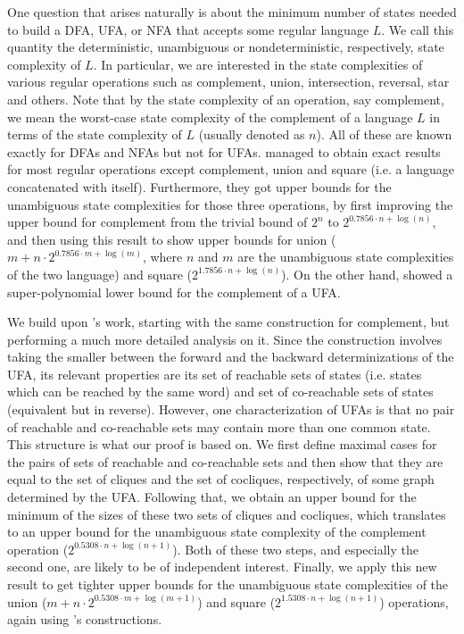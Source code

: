 \documentclass{report}
\theoremstyle{definition}
\begin{document}
One question that arises naturally is about the minimum number of states needed
to build a DFA, UFA, or NFA that accepts some regular language $L$. We call this
quantity the deterministic, unambiguous or nondeterministic, respectively, state
complexity of $L$. In particular, we are interested in the state complexities
of various regular operations such as complement, union, intersection, reversal,
star and others. Note that by the state complexity of an operation, say
complement, we mean the worst-case state complexity of the complement of a
language $L$ in terms of the state complexity of $L$ (usually denoted as $n$).
All of these are known exactly for DFAs and NFAs but not for UFAs.
\cite{UFA_UB} managed to obtain exact results for most regular
operations except complement, union and square (i.e. a language concatenated with
itself). Furthermore, they got upper bounds for the unambiguous state complexities
for those three operations, by first improving the upper bound for
complement from the trivial bound of $2^n$ to $2^{0.7856 \cdot n + \log (n)}$, and
then using this result to show upper bounds for union
($m + n \cdot 2^{0.7856 \cdot m + \log (m)}$, where $n$ and $m$ are the unambiguous
state complexities of the two language) and square
($2^{1.7856 \cdot n + \log (n)}$). On the other hand, \cite{UFA_LB} showed a
super-polynomial lower bound for the complement of a UFA.

We build upon \cite{UFA_UB}'s work, starting with the same construction for
complement, but performing a much more detailed analysis on it. 
Since the construction involves taking the smaller between the forward
and the backward determinizations of the UFA, its relevant properties are
its set of reachable sets of states (i.e. states which can be reached by the
same word) and set of co-reachable sets of states (equivalent but in reverse).
However, one characterization of UFAs is that no pair of reachable and
co-reachable sets may contain more than one common state. This structure
is what our proof is based on. We first define maximal cases for the pairs of
sets of reachable and co-reachable sets and then show that they are equal to
the set of cliques and the set of cocliques, respectively, of some graph
determined by the UFA. Following that, we obtain an upper bound for the minimum
of the sizes of these two sets of cliques and cocliques, which translates to an
upper bound for the unambiguous state complexity of the complement operation
($2^{0.5308 \cdot n + \log (n + 1)}$). Both of these two
steps, and especially the second one, are likely to be of independent interest.
Finally, we apply this new result to get tighter upper bounds for the
unambiguous state complexities of the union
($m + n \cdot 2^{0.5308 \cdot m + \log (m + 1)}$) and square
($2^{1.5308 \cdot n + \log (n + 1)}$) operations, again using \cite{UFA_UB}'s
constructions.
\end{document}
